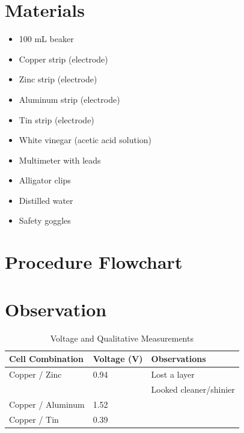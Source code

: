 \documentclass[11pt]{article}
\begin{document}
\section*{Materials}
\begin{itemize}
  \item 100 mL beaker
  \item Copper strip (electrode)
  \item Zinc strip (electrode)
  \item Aluminum strip (electrode)
  \item Tin strip (electrode)
  \item White vinegar (acetic acid solution)
  \item Multimeter with leads
  \item Alligator clips
  \item Distilled water
  \item Safety goggles
\end{itemize}

\section*{Procedure Flowchart}
\begin{procedureflowchart}
    \bstep
    \bstep
\end{procedureflowchart}
\newpage
\section*{Observation}
\begin{table}[ht]
  \caption{Voltage and Qualitative Measurements}
\begin{tabular}{p{4cm} p{3.5cm} p{5cm}}
\toprule
Cell Combination & Voltage (V) & Observations \\
\midrule
Copper / Zinc & 0.94 & Lost a layer\\
&&Looked cleaner/shinier\\
Copper / Aluminum &1.52 & \\
Copper / Tin &0.39 & \\
\bottomrule
\end{tabular}
\end{table}
\end{document}
